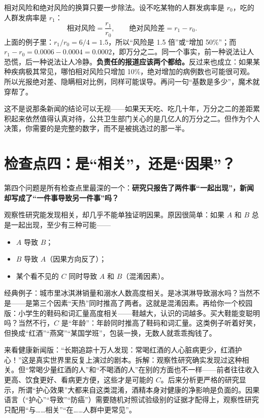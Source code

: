 \begin{qiaoliang}
相对风险和绝对风险的换算只要一步除法。设不吃某物的人群发病率是 $r_0$，吃的人群发病率是 $r_1$：
\[
\text{相对风险} = \frac{r_1}{r_0}, \qquad \text{绝对风险差} = r_1 - r_0 .
\]
上面的例子里：$r_1/r_0 = 6/4 = 1.5$，所以“风险是 1.5 倍”或“增加 50\%”；而 $r_1 - r_0 = 0.0006 - 0.0004 = 0.0002$，即万分之二。同一个事实，前一种说法让人恐慌，后一种说法让人冷静。\textbf{负责任的报道应该两个都给。}反过来也成立：如果某种疾病极其常见，哪怕相对风险只增加 10\%，绝对增加的病例数也可能很可观。所以光报绝对差、隐瞒相对比例，同样可能误导。再问一句“基数是多少”，魔术就穿帮了。
\end{qiaoliang}

这不是说那条新闻的结论可以无视——如果天天吃、吃几十年，万分之二的差距累积起来依然值得认真对待，公共卫生部门关心的是几亿人的万分之二。但作为个人决策，你需要的是完整的数字，而不是被挑选过的那一半。

\section{检查点四：是“相关”，还是“因果”？}

第四个问题是所有检查点里最深的一个：\textbf{研究只报告了两件事“一起出现”，新闻却写成了“一件事导致另一件事”吗？}

观察性研究能发现相关，却几乎不能单独证明因果。原因很简单：如果 $A$ 和 $B$ 总是一起出现，至少有三种可能——

\begin{itemize}[itemsep=2pt]
\item $A$ 导致 $B$；
\item $B$ 导致 $A$（因果方向反了）；
\item 某个看不见的 $C$ 同时导致 $A$ 和 $B$（混淆因素）。
\end{itemize}

经典例子：城市里冰淇淋销量和溺水人数高度相关。是冰淇淋导致溺水吗？当然不是——是第三个因素“天热”同时推高了两者。这就是混淆因素。再给你一个校园版：小学生的鞋码和词汇量高度相关——鞋越大，认识的词越多。买大鞋能变聪明吗？当然不行，$C$ 是“年龄”：年龄同时推高了鞋码和词汇量。这类例子听着好笑，但换成“红酒”“燕窝”“某国学班”，包装一换，无数人就乖乖掏钱了。

来看健康新闻版：“长期追踪十万人发现：常喝红酒的人心脏病更少，红酒护心！”这是真实世界里反复上演过的剧本。拆解：观察性研究确实发现过这种相关。但“常喝少量红酒的人”和“不喝酒的人”在别的方面也不一样——前者往往收入更高、饮食更好、看病更方便，这些才是可能的 $C$。后来分析更严格的研究显示，所谓“护心效果”大都来自这类混淆，酒精本身对健康的净影响是负面的。因果语言（“护心”“导致”“防癌”）需要随机对照试验级别的证据才配得上，观察性研究只配用“与……相关”“在……人群中更常见”。

